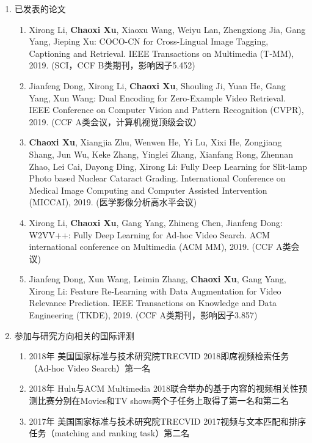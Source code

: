 
\begin{achievement}%
    \begin{enumerate}[1.]
        \item 已发表的论文
            \begin{enumerate}[(1)]
                \item Xirong Li, \textbf{Chaoxi Xu}, Xiaoxu Wang, Weiyu Lan, Zhengxiong Jia, Gang Yang, Jieping Xu: COCO-CN for Cross-Lingual Image Tagging, Captioning and Retrieval. IEEE Transactions on Multimedia (T-MM), 2019. (SCI，CCF B类期刊，影响因子5.452)
                \item Jianfeng Dong, Xirong Li, \textbf{Chaoxi Xu}, Shouling Ji, Yuan He, Gang Yang, Xun Wang: Dual Encoding for Zero-Example Video Retrieval. IEEE Conference on Computer Vision and Pattern Recognition (CVPR), 2019. (CCF A类会议，计算机视觉顶级会议）
                \item \textbf{Chaoxi Xu}, Xiangjia Zhu, Wenwen He, Yi Lu, Xixi He, Zongjiang Shang, Jun Wu, Keke Zhang, Yinglei Zhang, Xianfang Rong, Zhennan Zhao, Lei Cai, Dayong Ding, Xirong Li: Fully Deep Learning for Slit-lamp Photo based Nuclear Cataract Grading. International Conference on Medical Image Computing and Computer Assisted Intervention (MICCAI), 2019. (医学影像分析高水平会议)
                \item Xirong Li, \textbf{Chaoxi Xu}, Gang Yang, Zhineng Chen, Jianfeng Dong: W2VV++: Fully Deep Learning for Ad-hoc Video Search. ACM international conference on Multimedia (ACM MM), 2019. (CCF A类会议)
                \item Jianfeng Dong, Xun Wang, Leimin Zhang, \textbf{Chaoxi Xu}, Gang Yang, Xirong Li: Feature Re-Learning with Data Augmentation for Video Relevance Prediction. IEEE Transactions on Knowledge and Data Engineering (TKDE), 2019. (CCF A类期刊，影响因子3.857)
            \end{enumerate}

        \item 参加与研究方向相关的国际评测
            \begin{enumerate}[(1)]
                \item 2018年 美国国家标准与技术研究院TRECVID 2018即席视频检索任务（Ad-hoc Video Search）第一名
                \item 2018年 Hulu与ACM Multimedia 2018联合举办的基于内容的视频相关性预测比赛分别在Movies和TV shows两个子任务上取得了第一名和第二名
                \item 2017年 美国国家标准与技术研究院TRECVID 2017视频与文本匹配和排序任务（matching and ranking task）第二名
            \end{enumerate}
    \end{enumerate}

\end{achievement}
